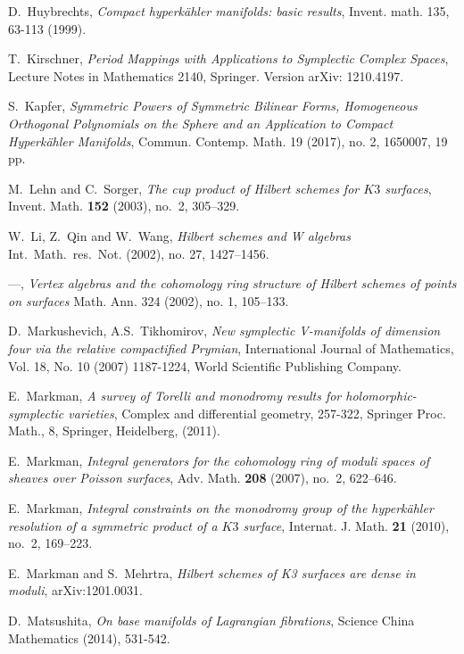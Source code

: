 \documentclass{alggeom}
\theoremstyle{plain}
\theoremstyle{definition}
\theoremstyle{remark}
\begin{document}
\begin{thebibliography}{10}
D.~Huybrechts,
\emph{ Compact hyperk\"ahler manifolds: basic results},
Invent. math. 
135, 63-113 (1999).

T.~Kirschner, 
\emph{Period Mappings with Applications to Symplectic Complex Spaces},
Lecture Notes in Mathematics 2140, Springer.
Version arXiv: 1210.4197.
  
S.~Kapfer, \emph{Symmetric Powers of Symmetric Bilinear Forms, Homogeneous Orthogonal Polynomials 
  on the Sphere and an Application to Compact Hyperk\"ahler Manifolds},
Commun. Contemp. Math. 19 (2017), no. 2, 1650007, 19 pp.   
  
M.~Lehn and C.~Sorger, \emph{The cup product of Hilbert schemes for {$K3$}
  surfaces}, Invent. Math. \textbf{152} (2003), no.~2, 305--329.

W.~Li, Z.~Qin and W.~Wang, \emph{Hilbert schemes and W algebras} Int.~Math.~res.~Not. (2002),
  no. 27, 1427--1456.

---, \emph{Vertex algebras and the cohomology ring structure of 
  Hilbert schemes of points on surfaces} Math. Ann. 324 (2002), no. 1, 105--133.  
  
D.~Markushevich, A.S.~Tikhomirov,
\emph{ New symplectic V-manifolds of dimension four via the relative compactified Prymian},
International Journal of Mathematics, Vol. 18, No. 10 (2007) 1187-1224,
World Scientific Publishing Company.  
  
E.~Markman,
\emph{ A survey of Torelli and monodromy results for holomorphic-symplectic varieties},
Complex and differential geometry,
257-322, Springer Proc. Math., 8, Springer, Heidelberg, (2011).  
  
E.~Markman, \emph{Integral generators for the cohomology ring of moduli spaces of
  sheaves over Poisson surfaces}, Adv. Math. \textbf{208} (2007), no.~2,
  622--646.

E.~Markman, \emph{Integral constraints on the monodromy group of the
  hyperk\"ahler resolution of a symmetric product of a {$K3$} surface},
  Internat. J. Math. \textbf{21} (2010), no.~2, 169--223.

E.~Markman and S.~Mehrtra,
\emph{Hilbert schemes of K3 surfaces are dense in moduli},
arXiv:1201.0031.

D.~Matsushita,
\emph{On base manifolds of Lagrangian fibrations},
Science China Mathematics (2014), 531-542.


\end{thebibliography}
\end{document}
